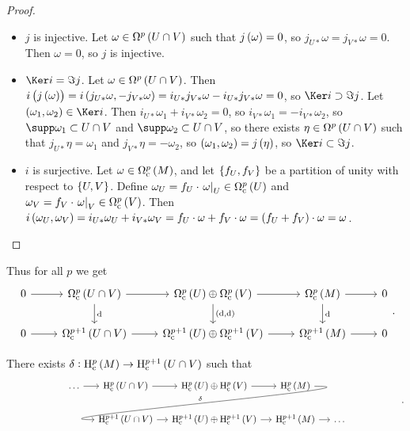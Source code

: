 \begin{proof}
\hfill
\begin{itemize}
\item $ j $ is injective. Let $ \omega \in \Omega^p\br{U \cap V} $ such that $ j\br{\omega} = 0 $, so $ j_{U*}\omega = j_{V*}\omega = 0 $. Then $ \omega = 0 $, so $ j $ is injective.
\item $ \Ker i = \Im j $. Let $ \omega \in \Omega^p\br{U \cap V} $. Then $ i\br{j\br{\omega}} = i\br{j_{U*}\omega, -j_{V*}\omega} = i_{U*}j_{V*}\omega - i_{U*}j_{V*}\omega = 0 $, so $ \Ker i \supset \Im j $. Let $ \br{\omega_1, \omega_2} \in \Ker i $. Then $ i_{U*}\omega_1 + i_{V*}\omega_2 = 0 $, so $ i_{V*}\omega_1 = -i_{V*}\omega_2 $, so $ \supp \omega_1 \subset U \cap V $ and $ \supp \omega_2 \subset U \cap V $, so there exists $ \eta \in \Omega^p\br{U \cap V} $ such that $ j_{U*}\eta = \omega_1 $ and $ j_{V*}\eta = -\omega_2 $, so $ \br{\omega_1, \omega_2} = j\br{\eta} $, so $ \Ker i \subset \Im j $.
\item $ i $ is surjective. Let $ \omega \in \Omega_\c^p\br{M} $, and let $ \cbr{f_U, f_V} $ be a partition of unity with respect to $ \cbr{U, V} $. Define $ \omega_U = f_U \cdot \eval{\omega}_U \in \Omega_\c^p\br{U} $ and $ \omega_V = f_V \cdot \eval{\omega}_V \in \Omega_\c^p\br{V} $. Then $ i\br{\omega_U, \omega_V} = i_{U*}\omega_U + i_{V*}\omega_V = f_U \cdot \omega + f_V \cdot \omega = \br{f_U + f_V} \cdot \omega = \omega $.
\end{itemize}
\end{proof}

Thus for all $ p $ we get
$$
\begin{tikzcd}
0 \arrow{r} & \Omega_\c^p\br{U \cap V} \arrow{r} \arrow{d}{\d} & \Omega_\c^p\br{U} \oplus \Omega_\c^p\br{V} \arrow{r} \arrow{d}{\br{\d, \d}} & \Omega_\c^p\br{M} \arrow{r} \arrow{d}{\d} & 0 \\
0 \arrow{r} & \Omega_\c^{p + 1}\br{U \cap V} \arrow{r} & \Omega_\c^{p + 1}\br{U} \oplus \Omega_\c^{p + 1}\br{V} \arrow{r} & \Omega_\c^{p + 1}\br{M} \arrow{r} & 0
\end{tikzcd}.
$$

\begin{theorem}
There exists $ \delta : \H_\c^p\br{M} \to \H_\c^{p + 1}\br{U \cap V} $ such that
$$
\begin{tikzcd}[column sep=small]
\dots \arrow{r} & \H_\c^p\br{U \cap V} \arrow{r} & \H_\c^p\br{U} \oplus \H_\c^p\br{V} \arrow{r} & \H_\c^p\br{M} \arrow[in=180, out=0, swap]{dll}{\delta} & \\
& \H_\c^{p + 1}\br{U \cap V} \arrow{r} & \H_\c^{p + 1}\br{U} \oplus \H_\c^{p + 1}\br{V} \arrow{r} & \H_\c^{p + 1}\br{M} \arrow{r} & \dots
\end{tikzcd}.
$$
\end{theorem}

